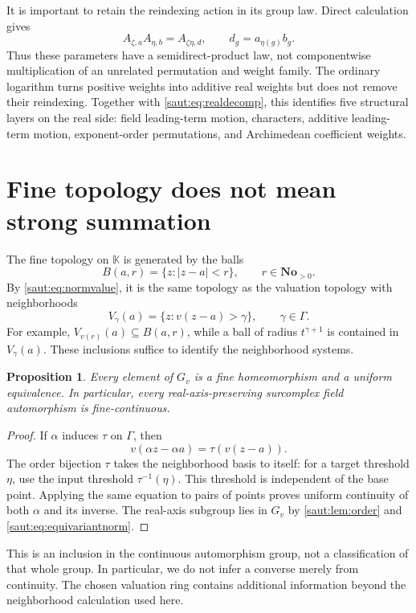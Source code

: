 \documentclass[11pt]{article}
\newtheorem{proposition}[theorem]{Proposition}
\theoremstyle{definition}
\theoremstyle{remark}
\newcommand{\No}{\mathbf{No}}
\newcommand{\K}{\mathbb K}
\numberwithin{equation}{section}
\begin{document}
It is important to retain the reindexing action in its group law. Direct
calculation gives
\begin{equation}\label{saut:eq:skeletonlaw}
 A_{\zeta,a} A_{\eta,b}=A_{\zeta\eta,d},
 \qquad d_g=a_{\eta(g)}b_g.
\end{equation}
Thus these parameters have a semidirect-product law, not componentwise
multiplication of an unrelated permutation and weight family. The ordinary
logarithm turns positive weights into additive real weights but does not
remove their reindexing. Together with \eqref{saut:eq:realdecomp}, this identifies
five structural layers on the real side: field leading-term motion,
characters, additive leading-term motion, exponent-order permutations,
and Archimedean coefficient weights.

\section{Fine topology does not mean strong summation}\label{saut:sec:topology}

The fine topology on $\K$ is generated by the balls
\[
 B(a,r)=\{z:|z-a|<r\},\qquad r\in\No_{>0}.
\]
By \eqref{saut:eq:normvalue}, it is the same topology as the valuation topology
with neighborhoods
\[
 V_\gamma(a)=\{z:v(z-a)>\gamma\},\qquad\gamma\in\Gamma.
\]
For example, $V_{v(r)}(a)\subseteq B(a,r)$, while a ball of radius
$t^{\gamma+1}$ is contained in $V_\gamma(a)$. These inclusions suffice to
identify the neighborhood systems.

\begin{proposition}\label{saut:prop:continuous}
Every element of $G_v$ is a fine homeomorphism and a uniform equivalence.
In particular, every real-axis-preserving surcomplex field automorphism is
fine-continuous.
\end{proposition}
\begin{proof}
If $\alpha$ induces $\tau$ on $\Gamma$, then
\[
 v(\alpha z-\alpha a)=\tau(v(z-a)).
\]
The order bijection $\tau$ takes the neighborhood basis to itself: for a
target threshold $\eta$, use the input threshold $\tau^{-1}(\eta)$.
This threshold is independent of the base point. Applying
the same equation to pairs of points proves uniform continuity of both
$\alpha$ and its inverse. The real-axis subgroup lies in $G_v$ by
\cref{saut:lem:order} and \eqref{saut:eq:equivariantnorm}.
\end{proof}

This is an inclusion in the continuous automorphism group, not a
classification of that whole group. In particular, we do not infer a
converse merely from continuity. The chosen valuation ring contains
additional information beyond the neighborhood calculation used here.
\end{document}

